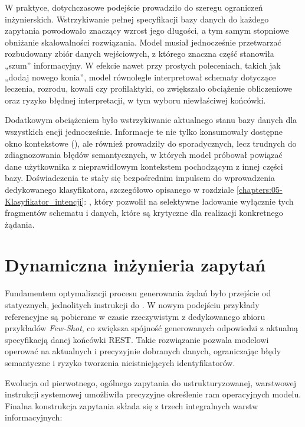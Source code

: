 W praktyce, dotychczasowe podejście prowadziło do szeregu ograniczeń inżynierskich. Wstrzykiwanie pełnej specyfikacji bazy danych do każdego zapytania powodowało znaczący wzrost jego długości, a tym samym stopniowe obniżanie skalowalności rozwiązania. Model musiał jednocześnie przetwarzać rozbudowany zbiór danych wejściowych, z którego znaczna część stanowiła „szum” informacyjny. W efekcie nawet przy prostych poleceniach, takich jak „dodaj nowego konia”, model równolegle interpretował schematy dotyczące leczenia, rozrodu, kowali czy profilaktyki, co zwiększało obciążenie obliczeniowe oraz ryzyko błędnej interpretacji, w tym wyboru niewłaściwej końcówki.

Dodatkowym obciążeniem było wstrzykiwanie aktualnego stanu bazy danych dla wszystkich encji jednocześnie. Informacje te nie tylko konsumowały dostępne okno kontekstowe (), ale również prowadziły do sporadycznych, lecz trudnych do zdiagnozowania błędów semantycznych, w których model próbował powiązać dane użytkownika z nieprawidłowym kontekstem pochodzącym z innej części bazy. Doświadczenia te stały się bezpośrednim impulsem do wprowadzenia dedykowanego klasyfikatora, szczegółowo opisanego w rozdziale \ref{chapters:05-Klasyfikator_intencji}: , który pozwolił na selektywne ładowanie wyłącznie tych fragmentów schematu i danych, które są krytyczne dla realizacji konkretnego żądania.


\section{Dynamiczna inżynieria zapytań}

Fundamentem optymalizacji procesu generowania żądań było przejście od statycznych, jednolitych instrukcji do . W nowym podejściu przykłady referencyjne są pobierane w czasie rzeczywistym z dedykowanego zbioru przykładów \textit{Few-Shot}, co zwiększa spójność generowanych odpowiedzi z aktualną specyfikacją danej końcówki REST. Takie rozwiązanie pozwala modelowi operować na aktualnych i precyzyjnie dobranych danych, ograniczając błędy semantyczne i ryzyko tworzenia nieistniejących identyfikatorów.

Ewolucja od pierwotnego, ogólnego zapytania do ustrukturyzowanej, warstwowej instrukcji systemowej umożliwiła precyzyjne określenie ram operacyjnych modelu. Finalna konstrukcja zapytania składa się z trzech integralnych warstw informacyjnych:

